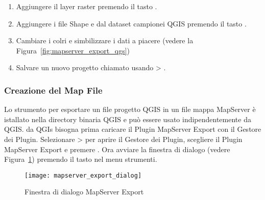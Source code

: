 \begin{enumerate}
\item Aggiungere il layer raster  premendo il tasto 
.
\item Aggiungere i file Shape  e 
 dal dataset campionei QGIS premendo il tasto 
 .
\item Cambiare i colri e simbilizzare i dati a piacere (vedere la Figura~\ref{fig:mapserver_export_qgs})
\item Salvare un nuovo progetto chiamato  usando 
 > .
\end{enumerate} 

\subsubsection{Creazione del Map File}

Lo strumento  per esportare un file progetto QGIS in un file mappa MapServer è istallato nella directory binaria QGIS e può essere usato indipendentemente da QGIS. da QGIs bisogna prima caricare il Plugin MapServer Export con il Gestore dei Plugin. 
Selezionare  >  per aprire il Gestore dei Plugin, 
scegliere il Plugin MapServer Export e premere . Ora avviare la finestra di dialogo 
 (vedere 
Figura~\ref{fig:mapserver_export_dialog}) premendo il tasto nel menu strumenti.

\begin{figure}[ht]
\begin{center}
  \caption{Finestra di dialogo MapServer Export \nixcaption}
  \label{fig:mapserver_export_dialog}\smallskip
  \texttt{[image: mapserver\_export\_dialog]}
\end{center}
\end{figure}

